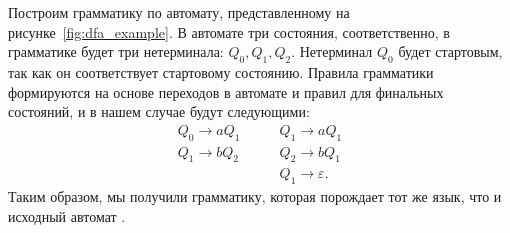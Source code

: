 \begin{example}
Построим грамматику по автомату, представленному на рисунке~\ref{fig:dfa_example}.
В автомате три состояния, соответственно, в грамматике будет три нетерминала: $Q_0, Q_1, Q_2$.
Нетерминал $Q_0$ будет стартовым, так как он соответствует стартовому состоянию.
Правила грамматики формируются на основе переходов в автомате и правил для финальных состояний, и в нашем случае будут следующими:
\begin{align*}
    Q_0 \to a Q_1  \quad & \quad Q_1 \to a Q_1 \\
    Q_1 \to b Q_2  \quad & \quad Q_2 \to b Q_1 \\
                     \quad & \quad Q_1 \to \varepsilon.
\end{align*}
Таким образом, мы получили грамматику, которая порождает тот же язык, что и исходный автомат%
.
\end{example}

\begin{marginfigure}
    \begin{center}
        
    \end{center}
    \caption{Автомат, построенный по грамматике $S \to aN_1$, $N_1 \to aN_1 \mid bbN_1 \mid \varepsilon$.
    Эквивалентен автомату из примера~\ref{exmpl:DFA}.}
    \label{fig:grammar_to_dfa}
\end{marginfigure}

